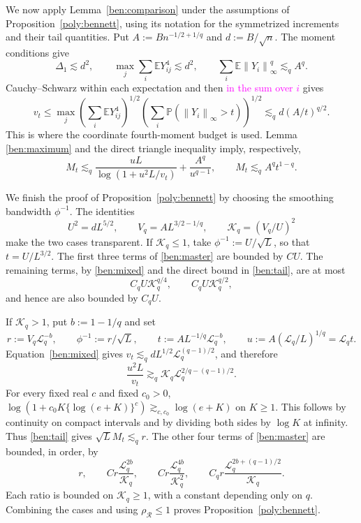 \documentclass[11pt,letterpaper]{article}
\newenvironment{recovered}{\color{magenta}}{}
\theoremstyle{remark}
\newcommand{\E}{\mathbb E}
\newcommand{\Pp}{\mathbb P}
\newcommand{\norm}[1]{\left\lVert#1\right\rVert}
\newcommand{\rh}{\rho_{\mathcal R}}
\begin{document}
\begin{recovered}
We now apply Lemma~\ref{ben:comparison} under the assumptions of
Proposition~\ref{poly:bennett}, using its notation for the symmetrized
increments and their tail quantities. Put
\(A:=Bn^{-1/2+1/q}\) and \(d:=B/\sqrt n\). The moment conditions give
\end{recovered}
\[
 \Delta_1\lesssim d^2,\qquad
 \max_j\sum_i\E Y_{ij}^4\lesssim d^2,\qquad
 \sum_i\E\norm{Y_i}_\infty^q\lesssim_q A^q.
\]
Cauchy--Schwarz within each expectation and then \textcolor{magenta}{in the sum over \(i\)} gives
\begin{equation}
 v_t\le
 \max_j\left(\sum_i\E Y_{ij}^4\right)^{1/2}
       \left(\sum_i\Pp(\norm{Y_i}_\infty>t)\right)^{1/2}
 \lesssim_q d(A/t)^{q/2}.
 \label{ben:mixed}
\end{equation}
This is where the coordinate fourth-moment budget is used. Lemma
\ref{ben:maximum} and the direct triangle inequality imply, respectively,
\begin{equation}
 M_t\lesssim_q\frac{uL}{\log(1+u^2L/v_t)}+\frac{A^q}{u^{q-1}},
 \qquad M_t\lesssim_q A^qt^{1-q}.
 \label{ben:tail}
\end{equation}

We finish the proof of Proposition~\ref{poly:bennett} by choosing the
smoothing bandwidth \(\phi^{-1}\). The identities
\[
 U^2=dL^{5/2},\qquad V_q=AL^{3/2-1/q},\qquad
 \mathcal K_q=(V_q/U)^2
\]
make the two cases transparent. If \(\mathcal K_q\le1\), take
\(\phi^{-1}:=U/\sqrt L\), so that \(t=U/L^{3/2}\).
The first three terms of \eqref{ben:master} are bounded by \(CU\).
The remaining terms, by \eqref{ben:mixed} and the direct bound in
\eqref{ben:tail}, are at most
\[
 C_qU \mathcal K_q^{q/4},\qquad C_qU \mathcal K_q^{q/2},
\]
and hence are also bounded by \(C_qU\).

If \(\mathcal K_q>1\), put \(b:=1-1/q\) and set
\[
 r:=V_q \mathcal{L}_q^{-b},\qquad \phi^{-1}:=r/\sqrt L,\qquad
 t:=AL^{-1/q}\mathcal{L}_q^{-b},\qquad u:=A(\mathcal{L}_q/L)^{1/q}=\mathcal{L}_q t.
\]
Equation~\eqref{ben:mixed} gives
\(v_t\lesssim_q dL^{1/2}\mathcal{L}_q^{(q-1)/2}\), and therefore
\[
 \frac{u^2L}{v_t}\gtrsim_q
 \mathcal K_q \mathcal{L}_q^{2/q-(q-1)/2}.
\]
For every fixed real \(c\) and fixed \(c_0>0\),
\(\log(1+c_0K\{\log(e+K)\}^c)\gtrsim_{c,c_0}\log(e+K)\)
on \(K\ge1\). This follows by continuity on compact intervals and
by dividing both sides by \(\log K\) at infinity. Thus
\eqref{ben:tail} gives \(\sqrt L M_t\lesssim_q r\).
The other four terms of \eqref{ben:master} are bounded, in order, by
\[
 r,\qquad C r\frac{\mathcal{L}_q^{2b}}{\mathcal K_q},\qquad
 C r\frac{\mathcal{L}_q^{4b}}{\mathcal K_q^2},\qquad
 C_q r\frac{\mathcal{L}_q^{2b+(q-1)/2}}{\mathcal K_q}.
\]
Each ratio is bounded on \(\mathcal K_q\ge1\), with a constant depending only
on \(q\). \begin{recovered}Combining the cases and using \(\rh\le1\)
proves Proposition~\ref{poly:bennett}.\end{recovered}
\end{document}
